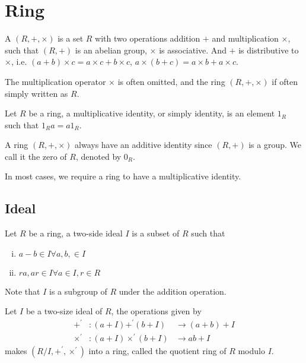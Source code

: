 \section{Ring}

\begin{defi}[ring]
A  $(R, +, \times)$ is a set $R$ with two operations addition $+$ and multiplication $\times$,
such that $(R, +)$ is an abelian group, $\times$ is associative. And $+$ is distributive to $\times$,
i.e. $(a + b) \times c = a \times c + b \times c$, $a\times(b + c) = a \times b + a \times c$.
\end{defi}

The multiplication operator $\times$ is often omitted, and the ring $(R, +, \times)$
if often simply written as $R$.

\begin{defi}
Let $R$ be a ring, a multiplicative identity, or simply identity,
is an element $1_R$ such that $1_R a = a 1_R$.
\end{defi}

A ring $(R, +, \times)$ always have an additive identity since $(R, +)$ is a group.
We call it the zero of $R$, denoted by $0_R$.

In most cases, we require a ring to have a multiplicative identity.

\subsection{Ideal}

\begin{defi}
Let $R$ be a ring, a two-side ideal $I$ is a subset of $R$ such that
\begin{enumerate}[i).]
\item $a - b \in I \forall a, b, \in I$
\item $ra, ar \in I \forall a \in I, r \in R$
\end{enumerate}
\end{defi}

Note that $I$ is a subgroup of $R$ under the addition operation.

\begin{defi}
Let $I$ be a two-size ideal of $R$, the operations given by
\begin{align*}
+^\prime &:  (a + I) +^\prime (b + I) &\to (a + b) + I \\
\times^\prime &: (a + I) \times^\prime (b + I) &\to ab + I
\end{align*}
makes $(R / I, +^\prime, \times^\prime)$ into a ring, called the quotient ring of
$R$ modulo $I$.
\end{defi}
